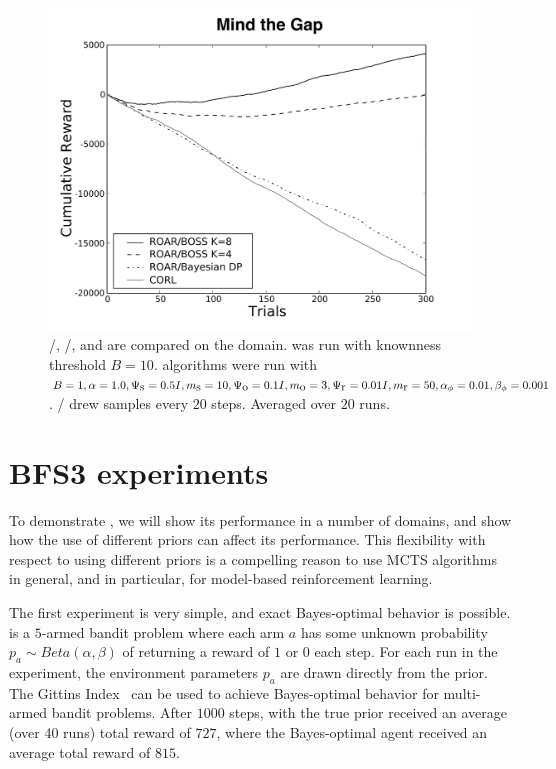 \begin{figure}[t]
\vskip 0.2in
\begin{center}
\centerline{\includegraphics[width=\columnwidth]{figures/bridge2Figure}}
\caption{/, /, and  are compared on the  domain.  was run with knownness threshold $B=10$.  algorithms were run with $B=1, \alpha=1.0,\Psi_{\mbox s}=0.5I, m_{\mbox s}=10, \Psi_{\mbox o}=0.1I, m_{\mbox o}=3, \Psi_{\mbox r}=0.01I,m_{\mbox r}=50,\alpha_\phi=0.01,\beta_\phi=0.001$. / drew samples every $20$ steps. Averaged over $20$ runs.}
\label{fig:bridge2}
\end{center}
\vskip -0.2in
\end{figure} 






\section{BFS3 experiments}

\label{sec:expr:bfs3}

To demonstrate , we will show its performance in a number of domains, and show how the use of different priors can affect its performance.  This flexibility with respect to using different priors is a compelling reason to use MCTS algorithms in general, and  in particular, for model-based reinforcement learning.

The first experiment is very simple, and exact Bayes-optimal behavior is possible.  is a $5$-armed bandit problem where each arm $a$ has some unknown probability $p_a \sim Beta(\alpha,\beta)$ of returning a reward of $1$ or $0$ each step. For each run in the experiment, the environment parameters $p_a$ are drawn directly from the prior. The Gittins Index~\cite{gittins89} can be used to achieve Bayes-optimal behavior for multi-armed bandit problems. After $1000$ steps,  with the true prior received an average (over 40 runs) total reward of $727$, where the Bayes-optimal agent received an average total reward of $815$.

